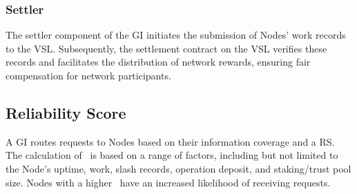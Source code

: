 \subsubsection{Settler}
The settler component of the \gls{GI} initiates the submission of \glspl{Node}' work records to the \gls{VSL}. Subsequently, the settlement contract on the \gls{VSL} verifies these records and facilitates the distribution of network rewards, ensuring fair compensation for network participants.

\subsection{Reliability Score}

A \gls{GI} routes requests to \glspl{Node} based on their information coverage and a \gls{RS}.
The calculation of \reliabilityScore\ is based on a range of factors, including but not limited to the \gls{Node}'s uptime, work, slash records, operation deposit, and staking/trust pool size.
\glspl{Node} with a higher \reliabilityScore\ have an increased likelihood of receiving requests.
